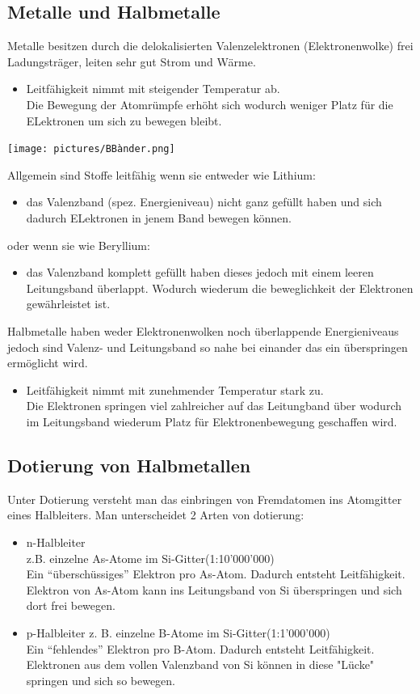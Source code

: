 \subsection{Metalle und Halbmetalle}
    Metalle besitzen durch die delokalisierten Valenzelektronen (Elektronenwolke) frei Ladungsträger, leiten sehr gut Strom und Wärme.
    \begin{itemize}
        \item Leitfähigkeit nimmt mit steigender Temperatur ab.\\Die Bewegung der Atomrümpfe erhöht sich wodurch weniger Platz für die ELektronen um sich zu bewegen bleibt.
    \end{itemize}
    \begin{center}
    \texttt{[image: pictures/BBànder.png]}
    \end{center}
    Allgemein sind Stoffe leitfähig wenn sie entweder wie Lithium:
    \begin{itemize}
        \item das Valenzband (spez. Energieniveau) nicht ganz gefüllt haben und sich dadurch ELektronen in jenem Band bewegen können.
    \end{itemize}
    oder wenn sie wie Beryllium:
    \begin{itemize}
        \item das Valenzband komplett gefüllt haben dieses jedoch mit einem leeren Leitungsband überlappt. Wodurch wiederum die beweglichkeit der Elektronen gewährleistet ist.
    \end{itemize}
    Halbmetalle haben weder Elektronenwolken noch überlappende Energieniveaus jedoch sind Valenz- und Leitungsband so nahe bei einander das ein überspringen ermöglicht wird.
    \begin{itemize}
        \item Leitfähigkeit nimmt mit zunehmender Temperatur stark zu.\\Die Elektronen springen viel zahlreicher auf das Leitungband über wodurch im Leitungsband wiederum Platz für Elektronenbewegung geschaffen wird.
    \end{itemize}
\subsection{Dotierung von Halbmetallen}
    Unter Dotierung versteht man das einbringen von Fremdatomen ins Atomgitter eines Halbleiters. Man unterscheidet 2 Arten von dotierung:
    \begin{itemize}
        \item n-Halbleiter\\
        z.B. einzelne As-Atome im Si-Gitter(1:10'000'000)\\Ein ``überschüssiges'' Elektron pro As-Atom. Dadurch entsteht Leitfähigkeit. Elektron von As-Atom kann ins Leitungsband von Si überspringen und sich dort frei bewegen.
        \item p-Halbleiter
        z. B. einzelne B-Atome im Si-Gitter(1:1'000'000)\\Ein ``fehlendes'' Elektron pro B-Atom. Dadurch entsteht Leitfähigkeit. Elektronen aus dem vollen Valenzband von Si können in diese "Lücke" springen und sich so bewegen.
    \end{itemize}
